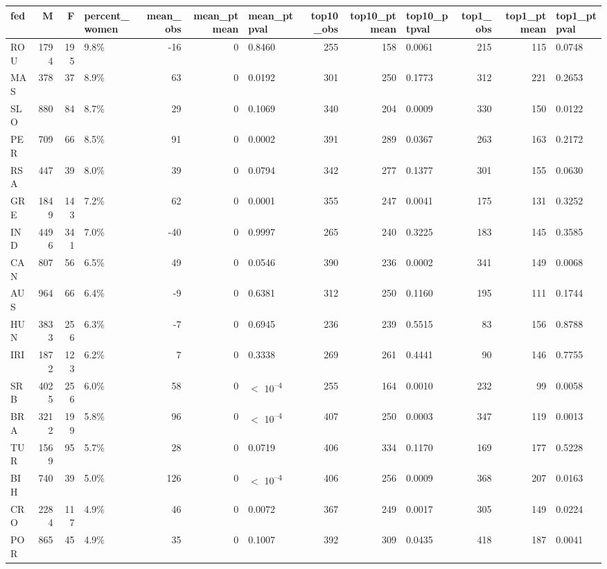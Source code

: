 
\begin{tabular}{l|r|r|l|r|r|l|r|r|l|r|r|l}
\hline
fed & M & F & percent_women & mean_obs & mean_ptmean & mean_ptpval & top10_obs & top10_ptmean & top10_ptpval & top1_obs & top1_ptmean & top1_ptpval\\
\hline
ROU & 1794 & 195 & 9.8\% & -16 & 0 & 0.8460 & 255 & 158 & 0.0061 & 215 & 115 & 0.0748\\
\hline
MAS & 378 & 37 & 8.9\% & 63 & 0 & 0.0192 & 301 & 250 & 0.1773 & 312 & 221 & 0.2653\\
\hline
SLO & 880 & 84 & 8.7\% & 29 & 0 & 0.1069 & 340 & 204 & 0.0009 & 330 & 150 & 0.0122\\
\hline
PER & 709 & 66 & 8.5\% & 91 & 0 & 0.0002 & 391 & 289 & 0.0367 & 263 & 163 & 0.2172\\
\hline
RSA & 447 & 39 & 8.0\% & 39 & 0 & 0.0794 & 342 & 277 & 0.1377 & 301 & 155 & 0.0630\\
\hline
GRE & 1849 & 143 & 7.2\% & 62 & 0 & 0.0001 & 355 & 247 & 0.0041 & 175 & 131 & 0.3252\\
\hline
IND & 4496 & 341 & 7.0\% & -40 & 0 & 0.9997 & 265 & 240 & 0.3225 & 183 & 145 & 0.3585\\
\hline
CAN & 807 & 56 & 6.5\% & 49 & 0 & 0.0546 & 390 & 236 & 0.0002 & 341 & 149 & 0.0068\\
\hline
AUS & 964 & 66 & 6.4\% & -9 & 0 & 0.6381 & 312 & 250 & 0.1160 & 195 & 111 & 0.1744\\
\hline
HUN & 3833 & 256 & 6.3\% & -7 & 0 & 0.6945 & 236 & 239 & 0.5515 & 83 & 156 & 0.8788\\
\hline
IRI & 1872 & 123 & 6.2\% & 7 & 0 & 0.3338 & 269 & 261 & 0.4441 & 90 & 146 & 0.7755\\
\hline
SRB & 4025 & 256 & 6.0\% & 58 & 0 & $<$ 10\textsuperscript{--4} & 255 & 164 & 0.0010 & 232 & 99 & 0.0058\\
\hline
BRA & 3212 & 199 & 5.8\% & 96 & 0 & $<$ 10\textsuperscript{--4} & 407 & 250 & 0.0003 & 347 & 119 & 0.0013\\
\hline
TUR & 1569 & 95 & 5.7\% & 28 & 0 & 0.0719 & 406 & 334 & 0.1170 & 169 & 177 & 0.5228\\
\hline
BIH & 740 & 39 & 5.0\% & 126 & 0 & $<$ 10\textsuperscript{--4} & 406 & 256 & 0.0009 & 368 & 207 & 0.0163\\
\hline
CRO & 2284 & 117 & 4.9\% & 46 & 0 & 0.0072 & 367 & 249 & 0.0017 & 305 & 149 & 0.0224\\
\hline
POR & 865 & 45 & 4.9\% & 35 & 0 & 0.1007 & 392 & 309 & 0.0435 & 418 & 187 & 0.0041\\

\end{tabular}
